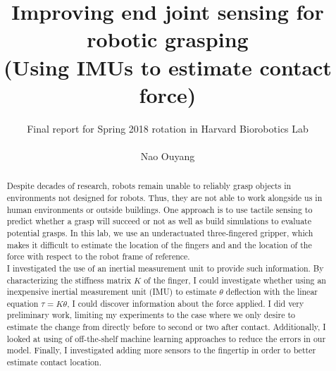 \documentclass[preprint,12pt,3p]{elsarticle}
\begin{document}
\begin{frontmatter}

\title{ Improving end joint sensing for robotic grasping\\
(Using IMUs to estimate contact force) }


\author{Final report for Spring 2018 rotation in Harvard Biorobotics Lab\\
~\\
Nao Ouyang}






\begin{abstract}
    Despite decades of research, robots remain unable to reliably grasp objects in environments not
    designed for robots. Thus, they are not able to work alongside us in human environments or
    outside buildings. One approach is to use tactile sensing to predict whether a
    grasp will succeed or not as well as build simulations to evaluate potential grasps.
    In this lab, we use an underactuated three-fingered gripper, which makes it difficult to
    estimate the location of the fingers and and the location of the force with respect to the robot
    frame of reference.  \\
    I investigated the use of an inertial measurement unit to provide such information. By
    characterizing the stiffness matrix $K$ of the finger, I could investigate whether using an
    inexpensive inertial measurement unit (IMU) to estimate $\theta$ deflection with the linear equation
    $\tau = K \theta$, I could discover information about the force applied. I did very preliminary
    work, limiting my experiments to the case where we only desire to estimate the change from
    directly before to second or two after
    contact. Additionally, I looked at using of off-the-shelf machine learning approaches to reduce the
    errors in our model. Finally, I investigated adding more sensors to the fingertip in
    order to better estimate contact location. 
\end{abstract}



\end{frontmatter}
\end{document}
